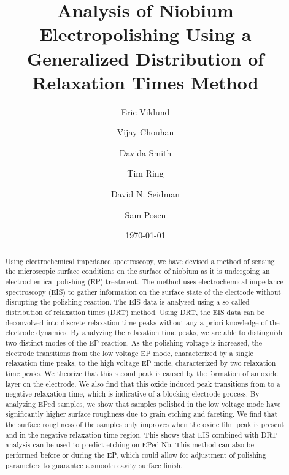 \documentclass[12pt]{article}
\begin{document}
\title{Analysis of Niobium Electropolishing Using a Generalized Distribution of Relaxation Times Method}
\author[1,2]{Eric Viklund}%
\author[2]{Vijay Chouhan}
\author[2]{Davida Smith}
\author[2]{Tim Ring}
\author[1]{David N. Seidman}
\author[2]{Sam Posen}

\date{\today}
\maketitle
\begin{abstract}
  Using electrochemical impedance spectroscopy, we have devised a method of sensing the microscopic surface conditions on the surface of niobium as it is undergoing an electrochemical polishing (EP) treatment. The method uses electrochemical impedance spectroscopy (EIS) to gather information on the surface state of the electrode without disrupting the polishing reaction. The EIS data is analyzed using a so-called distribution of relaxation times (DRT) method. Using DRT, the EIS data can be deconvolved into discrete relaxation time peaks without any a priori knowledge of the electrode dynamics. By analyzing the relaxation time peaks, we are able to distinguish two distinct modes of the EP reaction. As the polishing voltage is increased, the electrode transitions from the low voltage EP mode, characterized by a single relaxation time peaks, to the high voltage EP mode, characterized by two relaxation time peaks. We theorize that this second peak is caused by the formation of an oxide layer on the electrode. We also find that this oxide induced peak transitions from to a negative relaxation time, which is indicative of a blocking electrode process. By analyzing EPed samples, we show that samples polished in the low voltage mode have significantly higher surface roughness due to grain etching and faceting. We find that the surface roughness of the samples only improves when the oxide film peak is present and in the negative relaxation time region. This shows that EIS combined with DRT analysis can be used to predict etching on EPed Nb. This method can also be performed before or during the EP, which could allow for adjustment of polishing parameters to guarantee a smooth cavity surface finish.
\end{abstract}

\newpage

\printglossary[title={List of Terms}]

\newpage





\printbibliography
\end{document}
